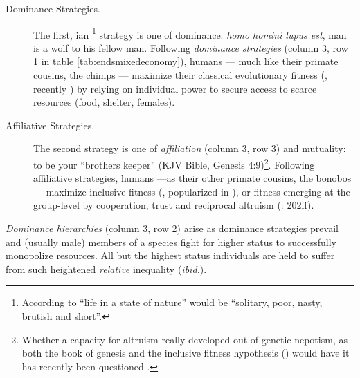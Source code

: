 \begin{description}
	\item[Dominance Strategies.] The first, \citeauthor{Hobbes-1651-aa}ian \citeyearpar{Hobbes-1651-aa}\footnote{
		According to \cite{Hobbes-1651-aa} ``life in a state of nature'' would be ``solitary, poor, nasty, brutish and short''.} 
	strategy is one of dominance: \emph{homo homini lupus est}, man is a wolf to his fellow man. Following \emph{dominance strategies} (column 3, row 1 in table \ref{tab:endsmixedeconomy}), humans --- much like their primate cousins, the chimps --- maximize their classical evolutionary fitness (\citealt{Darwin1859}, recently \citealt{Dawkins1976}) by relying on individual power to secure access to scarce resources (food, shelter, females).
	
	\item[Affiliative Strategies.] The second strategy is one of \emph{affiliation} (column 3, row 3) and mutuality: to be your ``brothers keeper'' (\gls{KJV} Bible, Genesis 4:9)\footnote{
		Whether a capacity for altruism really developed out of genetic nepotism, as both the book of genesis and the inclusive fitness hypothesis (\citealt{Hamilton1964,Wilson1975}) would have it has recently been questioned \citep{Wilson2012}.}. Following affiliative strategies, humans ---as their other primate cousins, the bonobos --- maximize inclusive fitness (\citealt{Hamilton1964}, popularized in \citealt{Wilson1975}), or fitness emerging at the group-level \citep{Wilson2012} by cooperation, trust and reciprocal altruism (\citealt{Pickett-2009-kx}: 202ff). 
\end{description}

\emph{Dominance hierarchies} (column 3, row 2) arise as dominance strategies prevail and (usually male) members of a species fight for higher status to successfully monopolize resources.  All but the highest status individuals are held to suffer from such heightened \emph{relative} inequality (\emph{ibid.}).

